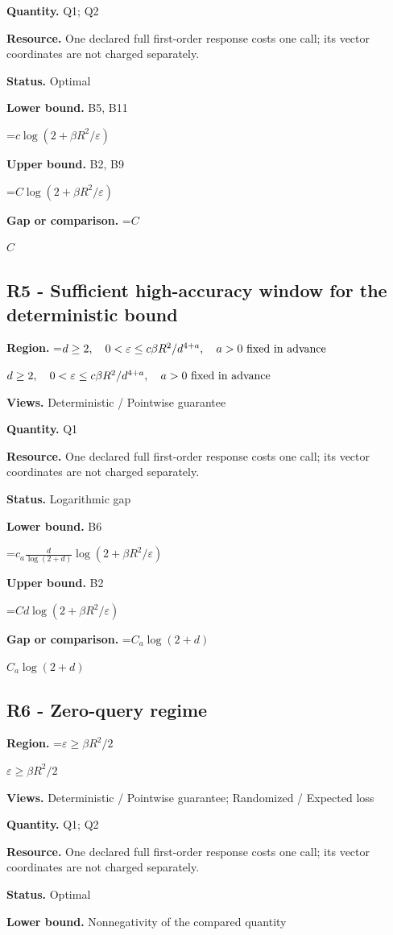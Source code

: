 \documentclass[10pt,a4paper]{article}
\newcommand{\AtlasMath}[1]{\par\begingroup\centering\setbox0=\hbox{$\displaystyle #1$}\ifdim\wd0>1.4\linewidth\typeout{ATLAS WIDE FORMULA: \the\wd0}\fi\ifdim\wd0>\linewidth\resizebox{\linewidth}{!}{\box0}\else\box0\fi\par\endgroup}
\newcommand{\AtlasInlineMath}[1]{\begingroup\setbox0=\hbox{$#1$}\ifdim\wd0>.4\linewidth\endgroup\AtlasMath{#1}\else\endgroup$#1$\fi}
\begin{document}
\textbf{Quantity.} Q1; Q2

\textbf{Resource.} One declared full first-order response costs one call; its vector coordinates are not charged separately.

\textbf{Status.} Optimal

\textbf{Lower bound.} B5, B11

\AtlasMath{c\log(2+\beta R^2/\varepsilon)}
\textbf{Upper bound.} B2, B9

\AtlasMath{C\log(2+\beta R^2/\varepsilon)}
\textbf{Gap or comparison.} \AtlasInlineMath{C}

\subsection{R5 - Sufficient high-accuracy window for the deterministic bound}
\textbf{Region.} \AtlasInlineMath{d\ge2,\quad0<\varepsilon\le c\beta R^2/d^{4+a},\quad a>0\text{ \text{fixed in advance}}}

\textbf{Views.} Deterministic / Pointwise guarantee

\textbf{Quantity.} Q1

\textbf{Resource.} One declared full first-order response costs one call; its vector coordinates are not charged separately.

\textbf{Status.} Logarithmic gap

\textbf{Lower bound.} B6

\AtlasMath{c_a\frac d{\log(2+d)}\log(2+\beta R^2/\varepsilon)}
\textbf{Upper bound.} B2

\AtlasMath{C d\log(2+\beta R^2/\varepsilon)}
\textbf{Gap or comparison.} \AtlasInlineMath{C_a\log(2+d)}

\subsection{R6 - Zero-query regime}
\textbf{Region.} \AtlasInlineMath{\varepsilon\ge\beta R^2/2}

\textbf{Views.} Deterministic / Pointwise guarantee; Randomized / Expected loss

\textbf{Quantity.} Q1; Q2

\textbf{Resource.} One declared full first-order response costs one call; its vector coordinates are not charged separately.

\textbf{Status.} Optimal

\textbf{Lower bound.} Nonnegativity of the compared quantity
\end{document}
